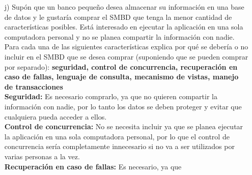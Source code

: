 \documentclass[a4paper, 12pt]{report}
\begin{document}
\begin{enumerate}
{\begin{enumerate}
{\begin{enumerate}
            \item{Cuidar de la integridad y seguridad de los datos}
            \item{Respaldo y recuperación}
            \item{Control de concurrencia}
        \end{enumerate}
        Sin poder interactuar con el sistema administrador de archivos es imposible
        guardar y recuperar los datos.\\
        En caso de que el SMBD no cuide de la integridad y seguridad de los datos
        pueden surgir problemas del tipo que alguna persona no deseada pueda acceder
        y mulipular los datos (seguridad) o de que los datos se hayan corrompido
        (integridad).\\
        Sin respaldo y recuperación surge el problema de que se puedan perder los
        datos de manera permanente.
        Finalmente, sin un control de concurrencia correcto, surge el problema de
        que se intente acceder a la información desde diversos puntos ya sea para
        leerla o modificarla pero con el problema de que ambas lecturas puedan
        ser distintas.
        \cite{RDBMS}
    }
    \item[j)]{Supón  que  un banco pequeño desea  almacenar  su
    información  en una  base  de  datos  y  le gustaría comprar
    el SMBD que  tenga  la  menor  cantidad  de  características
    posibles. Está interesado en ejecutar la aplicación en una sola computadora personal y no se planea compartir la
    información  con  nadie.  Para  cada  una  de  las
    siguientes  características  explica  por  qué  se debería o
    no incluir en el SMBD que se desea comprar (suponiendo que se
    pueden comprar por separado): \textbf{seguridad, control de
    concurrencia, recuperación en caso de fallas, lenguaje de
    consulta, mecanismo de vistas, manejo de transacciones}\\
    \textbf{Seguridad:} Es necesario comprarlo, ya que no quieren
    compartir la información con nadie, por lo tanto los datos
    se deben proteger y evitar que cualquiera pueda acceder a
    ellos.\\
    \textbf{Control de concurrencia:} No se necesita incluir ya que
    se planea ejecutar la aplicación en una sola computadora
    personal, por lo que el control de concurrencia sería
    completamente innecesario si no va a ser utilizados por varias
    personas a la vez.\\
    \textbf{Recuperación en caso de fallas:} Es necesario, ya que
}
\end{enumerate}}
\end{enumerate}
\end{document}
